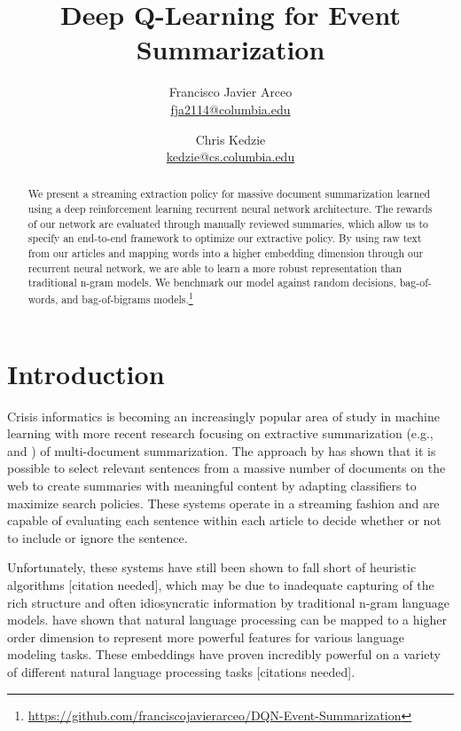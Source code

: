 \documentclass[12pt]{article}
\title{Deep Q-Learning for Event Summarization }
\author{
	Francisco Javier Arceo \\ \href{mailto: fja2114@columbia.edu}{\small fja2114@columbia.edu} 
		\and  
	Chris Kedzie \\ \href{mailto: kedzie@cs.columbia.edu}{\small kedzie@cs.columbia.edu} 
	}
\begin{document}
\maketitle

\begin{abstract}
We present a streaming extraction policy for massive document summarization learned using a deep reinforcement learning recurrent neural network architecture. The rewards of our network are evaluated through manually reviewed summaries, which allow us to specify an end-to-end framework to optimize our extractive policy.  By using raw text from our articles and mapping words into a higher embedding dimension through our recurrent neural network, we are able to learn a more robust representation than traditional n-gram models. We benchmark our model against random decisions, bag-of-words, and bag-of-bigrams models.\footnote{ \url{https://github.com/franciscojavierarceo/DQN-Event-Summarization} }
\end{abstract}



\section{Introduction}

Crisis informatics is becoming an increasingly popular area of study in machine learning with more recent research focusing on extractive summarization (e.g., \cite{kedzie2015predicting} and \cite{kedzieextractive}) of multi-document summarization. The approach by \cite{kedzie2015predicting}  has shown that it is possible to select relevant sentences from a massive number of documents on the web to create summaries with meaningful content by adapting classifiers to maximize search policies. These systems operate in a streaming fashion and are capable of evaluating each sentence within each article to decide whether or not to include or ignore the sentence. 

Unfortunately, these systems have still been shown to fall short of heuristic algorithms [citation needed], which may be due to inadequate capturing of the rich structure and often idiosyncratic information by traditional n-gram language models. \cite{bengio2003neural} have shown that natural language processing can be mapped to a higher order dimension to represent more powerful features for various language modeling tasks. These embeddings have proven incredibly powerful on a variety of different natural language processing tasks [citations needed].
\end{document}
